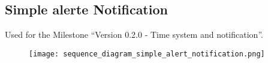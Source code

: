 \subsection{Simple alerte Notification}
Used for the Milestone ``Version 0.2.0 - Time system and notification''.

\begin{figure}[h]
	\centering
	\texttt{[image: sequence\_diagram\_simple\_alert\_notification.png]}
\end{figure}